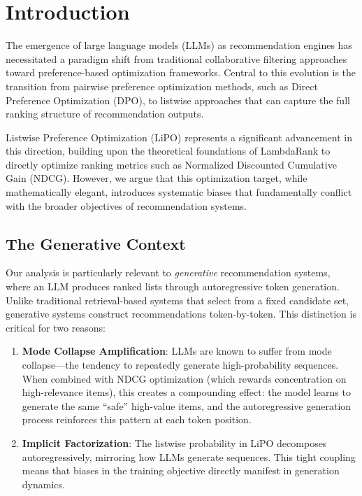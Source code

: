 \documentclass[11pt,a4paper]{article}
\theoremstyle{definition}
\theoremstyle{plain}
\theoremstyle{remark}
\begin{document}
\section{Introduction}
\label{sec:introduction}

The emergence of large language models (LLMs) as recommendation engines has necessitated a paradigm shift from traditional collaborative filtering approaches toward preference-based optimization frameworks. Central to this evolution is the transition from pairwise preference optimization methods, such as Direct Preference Optimization (DPO), to listwise approaches that can capture the full ranking structure of recommendation outputs.

Listwise Preference Optimization (LiPO) \cite{liu2024lipo} represents a significant advancement in this direction, building upon the theoretical foundations of LambdaRank \cite{burges2010ranknet} to directly optimize ranking metrics such as Normalized Discounted Cumulative Gain (NDCG). However, we argue that this optimization target, while mathematically elegant, introduces systematic biases that fundamentally conflict with the broader objectives of recommendation systems.

\subsection{The Generative Context}
\label{subsec:generative_context}

Our analysis is particularly relevant to \textit{generative} recommendation systems, where an LLM produces ranked lists through autoregressive token generation. Unlike traditional retrieval-based systems that select from a fixed candidate set, generative systems construct recommendations token-by-token. This distinction is critical for two reasons:

\begin{enumerate}[label=(\roman*)]
    \item \textbf{Mode Collapse Amplification}: LLMs are known to suffer from mode collapse---the tendency to repeatedly generate high-probability sequences. When combined with NDCG optimization (which rewards concentration on high-relevance items), this creates a compounding effect: the model learns to generate the same ``safe'' high-value items, and the autoregressive generation process reinforces this pattern at each token position.
    
    \item \textbf{Implicit Factorization}: The listwise probability in LiPO decomposes autoregressively, mirroring how LLMs generate sequences. This tight coupling means that biases in the training objective directly manifest in generation dynamics.
\end{enumerate}
\end{document}
